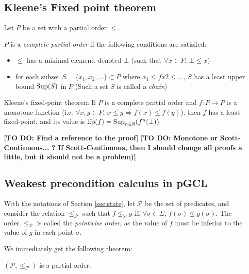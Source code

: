\documentclass[a4paper,10pt]{llncs}
\def\NN {{\mathbb N}}
\def\Sup {\textnormal {Sup}}
\newcommand\todo[1]{{\color{red}\textbf{[TO DO:  #1]}}}
\begin{document}
\subsection{Kleene's Fixed point theorem}
\label{subsec:kleene}

Let $P$ be a set with a partial order $\leq$.
\begin{definition}
$P$ is a \emph{complete partial order} if the following conditions are satisfied:
\begin{itemize}
\item $\leq$ has a minimal element, denoted $\bot$ (such that $\forall x \in P$, $\bot \leq x$)
\item for each subset $S = \{x_1, x_2, \dots \} \subset P$ where $x_1 \leq fx2 \leq \dots $, $S$ has a least upper bound $\Sup(S)$ in $P$ (Such a set $S$ is called a \emph{chain})
\end{itemize}
\end{definition}

\begin{theorem}{\textnormal{Kleene's fixed-point theorem}}
If $P$ is a complete partial order and $f : P \rightarrow P$ is a monotone function (i.e. $\forall x,y \in P$, $x \leq y \Rightarrow f(x) \leq f(y)$), then $f$ has a least fixed-point, and its value is $\textnormal{lfp}(f) = \Sup_{n \in \NN}(f^n(\bot))$
\end{theorem} \todo{Find a reference to the proof}
\todo{Monotone or Scott-Continuous... ? If Scott-Continuous, then I should change all proofs a little, but it should not be a problem)}
\subsection{Weakest precondition calculus in pGCL}
\label{subsec:predicates_cpo}

With the notations of Section \ref{sec:state}, let $\mathcal{P}$ be the set of predicates, and consider the relation $\leq_{\mathcal{P}}$ such that $f \leq_{\mathcal{P}} g$ iff $\forall \sigma \in \Sigma$, $f(\sigma) \leq g(\sigma)$. The order $\leq_{\mathcal{P}}$ is called the \emph{pointwise order}, as the value of $f$ must be inferior to the value of $g$ in each point $\sigma$.\bigskip

We immediately get the following theorem:
\begin{theorem}
$(\mathcal{P},\leq_{\mathcal{P}})$ is a partial order.
\end{theorem}
\end{document}
